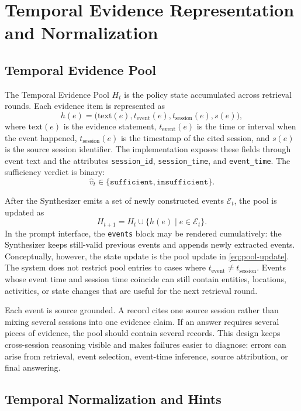 \section{Temporal Evidence Representation and Normalization}
\label{sec:methods-temporal-evidence}

\subsection{Temporal Evidence Pool}
\label{subsec:methods-pool}

The Temporal Evidence Pool $H_t$ is the policy state accumulated across
retrieval rounds. Each evidence item is represented as
\[
  h(e)=
  \bigl(\mathrm{text}(e),t_{\mathrm{event}}(e),
  t_{\mathrm{session}}(e),s(e)\bigr),
\]
where $\mathrm{text}(e)$ is the evidence statement,
$t_{\mathrm{event}}(e)$ is the time or interval when the event happened,
$t_{\mathrm{session}}(e)$ is the timestamp of the cited session, and $s(e)$ is
the source session identifier. The implementation exposes these fields through
event text and the attributes \texttt{session\_id}, \texttt{session\_time}, and
\texttt{event\_time}. The sufficiency verdict is binary:
\[
  \hat{v}_t\in\{\texttt{sufficient},\texttt{insufficient}\}.
\]

After the Synthesizer emits a set of newly constructed events
$\mathcal{E}_t$, the pool is updated as
\[
  H_{t+1}=H_t\cup\{h(e)\mid e\in\mathcal{E}_t\}.
  \label{eq:pool-update}
\]
In the prompt interface, the \texttt{events} block may be rendered cumulatively:
the Synthesizer keeps still-valid previous events and appends newly extracted
events. Conceptually, however, the state update is the pool update in
\autoref{eq:pool-update}. The system does not restrict pool entries to cases
where $t_{\mathrm{event}}\ne t_{\mathrm{session}}$. Events whose event time and
session time coincide can still contain entities, locations, activities, or
state changes that are useful for the next retrieval round.

Each event is source grounded. A record cites one source session rather than
mixing several sessions into one evidence claim. If an answer requires several
pieces of evidence, the pool should contain several records. This design keeps
cross-session reasoning visible and makes failures easier to diagnose: errors
can arise from retrieval, event selection, event-time inference, source
attribution, or final answering.

\subsection{Temporal Normalization and Hints}
\label{subsec:methods-normalization}


